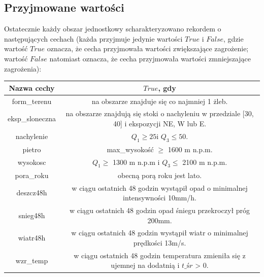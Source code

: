\subsection{Przyjmowane wartości}
Ostatecznie każdy obszar jednostkowy scharakteryzowano rekordem o następujących cechach (każda przyjmuje jedynie wartości $True$ i $False$, gdzie wartość $True$ oznacza, że cecha przyjmowała wartości zwiększające zagrożenie; wartość $False$ natomiast oznacza, że cecha przyjmowała wartości zmniejszające zagrożenia):
\begin{center}
	\begin{tabular}{|c|c|} 
		\hline
		Nazwa cechy & $True$, gdy \\ 
		\hline
		form\_terenu & na obszarze znajduje się co najmniej 1 żleb. \\ 
		eksp\_sloneczna & na obszarze znajdują się stoki o nachyleniu w przedziale [30\degree, 40\degree] i ekspozycji NE, W lub E. \\
		nachylenie & $ Q_1 \geq 25$\degree \:i\: $ Q_3 \leq 50$\degree. \\
		pietro & max\_wysokość $\geq$ 1600 m n.p.m. \\
		wysokosc & $ Q_1 \geq$ 1300 m n.p.m \:i\: $ Q_3 \leq$ 2100 m n.p.m. \\
		pora\_roku & obecną porą roku jest lato. \\ 
		deszcz48h & w ciągu ostatnich 48 godzin wystąpił opad o minimalnej intensywności 10mm/h. \\
		snieg48h & w ciągu ostatnich 48 godzin opad śniegu przekroczył próg 200mm. \\
		wiatr48h & w ciągu ostatnich 48 godzin wystąpił wiatr o minimalnej prędkości 13m/s. \\
		wzr\_temp & w ciągu ostatnich 48 godzin temperatura zmieniła się z ujemnej na dodatnią i $t\_śr$ > 0\degree. \\
		\hline
	\end{tabular}
\end{center}

